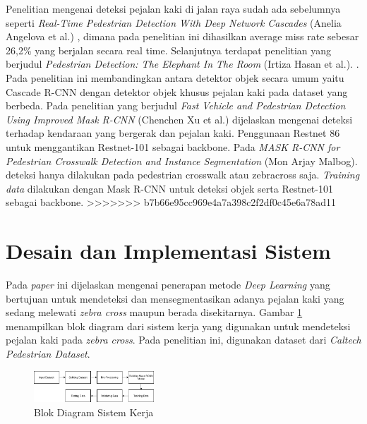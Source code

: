 \documentclass[conference]{IEEEtran}
\begin{document}
	Penelitian mengenai deteksi pejalan kaki di jalan raya sudah ada sebelumnya seperti \textit{Real-Time Pedestrian Detection With Deep Network Cascades} (Anelia Angelova et al.) \cite{cit:1}, dimana pada penelitian ini dihasilkan average miss rate sebesar 26,2\% yang berjalan secara real time. Selanjutnya terdapat penelitian yang berjudul \textit{Pedestrian Detection: The Elephant In The Room} (Irtiza Hasan et al.). \cite{cit:2}. Pada penelitian ini membandingkan antara detektor objek secara umum yaitu Cascade R-CNN dengan detektor objek khusus pejalan kaki pada dataset yang berbeda. Pada penelitian yang berjudul \textit{Fast Vehicle and Pedestrian Detection Using Improved Mask R-CNN} (Chenchen Xu et al.) \cite{cit:3} dijelaskan mengenai deteksi terhadap kendaraan yang bergerak dan pejalan kaki. Penggunaan Restnet 86 untuk menggantikan Restnet-101 sebagai backbone. Pada \textit{MASK R-CNN for Pedestrian Crosswalk Detection and Instance Segmentation} (Mon Arjay Malbog). \cite{cit:4} deteksi hanya dilakukan pada pedestrian crosswalk atau zebracross saja. \textit{Training data} dilakukan dengan Mask R-CNN untuk deteksi objek serta Restnet-101 sebagai backbone.
>>>>>>> b7b66e95cc969e4a7a398c2f2df0c45e6a78ad11
	
	\section{Desain dan Implementasi Sistem}
	\vspace{1ex}
	Pada \textit{paper} ini dijelaskan mengenai penerapan metode \textit{Deep Learning} yang bertujuan untuk mendeteksi dan mensegmentasikan adanya pejalan kaki yang sedang melewati \textit{zebra cross} maupun berada disekitarnya. Gambar \ref{fig:1} menampilkan blok diagram dari sistem kerja yang digunakan untuk mendeteksi pejalan kaki pada \textit{zebra cross}. Pada penelitian ini, digunakan dataset dari \textit{Caltech Pedestrian Dataset}.
	\vspace{1ex}
	\begin{figure}[!ht] \centering
		\includegraphics[width=0.4\textwidth]{img/blok-diagram.png}
		\caption{Blok Diagram Sistem Kerja}
		\label{fig:1}
	\end{figure}
\end{document}
